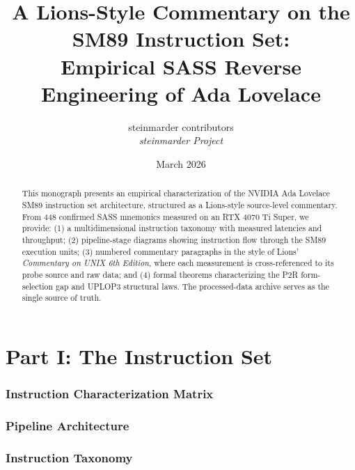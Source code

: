 \documentclass[11pt]{article}
\title{A Lions-Style Commentary on the SM89 Instruction Set:\\
  Empirical SASS Reverse Engineering of Ada Lovelace}
\author{%
  steinmarder contributors
  \\[4pt]
  \normalsize\textit{steinmarder Project}
}
\date{March 2026}
\begin{document}
\maketitle

\begin{abstract}
This monograph presents an empirical characterization of the NVIDIA Ada Lovelace
SM89 instruction set architecture, structured as a Lions-style source-level
commentary.  From 448 confirmed SASS mnemonics measured on an RTX 4070 Ti Super,
we provide: (1) a multidimensional instruction taxonomy with measured latencies
and throughput; (2) pipeline-stage diagrams showing instruction flow through the
SM89 execution units; (3) numbered commentary paragraphs in the style of Lions'
\textit{Commentary on UNIX 6th Edition}, where each measurement is
cross-referenced to its probe source and raw data; and (4) formal theorems
characterizing the P2R form-selection gap and UPLOP3 structural laws.
The processed-data archive serves as the single source of truth.
\end{abstract}

\tableofcontents
\clearpage


\part*{Part I: The Instruction Set}

\section{Instruction Characterization Matrix}


\section{Pipeline Architecture}
\label{fig:pipeline}


\section{Instruction Taxonomy}




\clearpage
\end{document}
